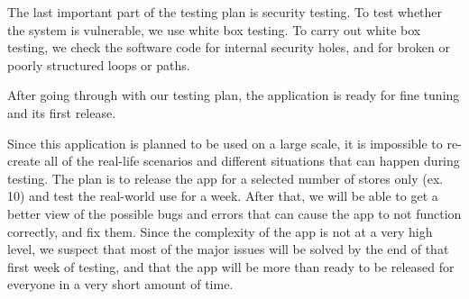 The last important part of the testing plan is security testing. To test whether the system is vulnerable, we use white box testing. To carry out white box testing, we check the software code for internal security holes, and for broken or poorly structured loops or paths. 

After going through with our testing plan, the application is ready for fine tuning and its first release. \newline

 

Since this application is planned to be used on a large scale, it is impossible to re-create all of the real-life scenarios and different situations that can happen during testing. The plan is to release the app for a selected number of stores only (ex. 10) and test the real-world use for a week. After that, we will be able to get a better view of the possible bugs and errors that can cause the app to not function correctly, and fix them. Since the complexity of the app is not at a very high level, we suspect that most of the major issues will be solved by the end of that first week of testing, and that the app will be more than ready to be released for everyone in a very short amount of time.